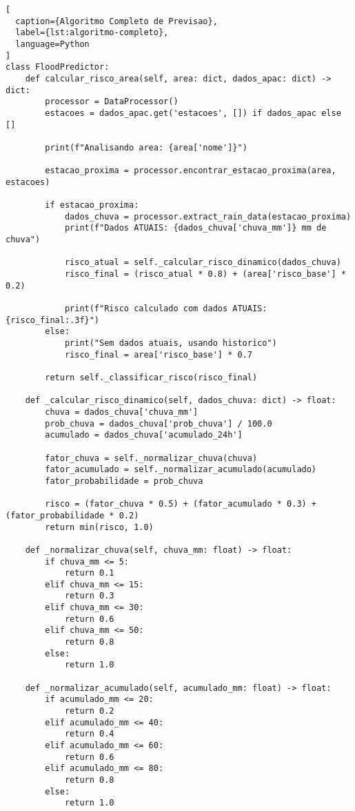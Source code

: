 \begin{apendicesenv}
\begin{lstlisting}[
  caption={Algoritmo Completo de Previsao},
  label={lst:algoritmo-completo},
  language=Python
]
class FloodPredictor:
    def calcular_risco_area(self, area: dict, dados_apac: dict) -> dict:
        processor = DataProcessor()
        estacoes = dados_apac.get('estacoes', []) if dados_apac else []

        print(f"Analisando area: {area['nome']}")

        estacao_proxima = processor.encontrar_estacao_proxima(area, estacoes)

        if estacao_proxima:
            dados_chuva = processor.extract_rain_data(estacao_proxima)
            print(f"Dados ATUAIS: {dados_chuva['chuva_mm']} mm de chuva")

            risco_atual = self._calcular_risco_dinamico(dados_chuva)
            risco_final = (risco_atual * 0.8) + (area['risco_base'] * 0.2)

            print(f"Risco calculado com dados ATUAIS: {risco_final:.3f}")
        else:
            print("Sem dados atuais, usando historico")
            risco_final = area['risco_base'] * 0.7

        return self._classificar_risco(risco_final)

    def _calcular_risco_dinamico(self, dados_chuva: dict) -> float:
        chuva = dados_chuva['chuva_mm']
        prob_chuva = dados_chuva['prob_chuva'] / 100.0
        acumulado = dados_chuva['acumulado_24h']

        fator_chuva = self._normalizar_chuva(chuva)
        fator_acumulado = self._normalizar_acumulado(acumulado)
        fator_probabilidade = prob_chuva

        risco = (fator_chuva * 0.5) + (fator_acumulado * 0.3) + (fator_probabilidade * 0.2)
        return min(risco, 1.0)

    def _normalizar_chuva(self, chuva_mm: float) -> float:
        if chuva_mm <= 5:
            return 0.1
        elif chuva_mm <= 15:
            return 0.3
        elif chuva_mm <= 30:
            return 0.6
        elif chuva_mm <= 50:
            return 0.8
        else:
            return 1.0

    def _normalizar_acumulado(self, acumulado_mm: float) -> float:
        if acumulado_mm <= 20:
            return 0.2
        elif acumulado_mm <= 40:
            return 0.4
        elif acumulado_mm <= 60:
            return 0.6
        elif acumulado_mm <= 80:
            return 0.8
        else:
            return 1.0


\end{lstlisting}
\end{apendicesenv}
